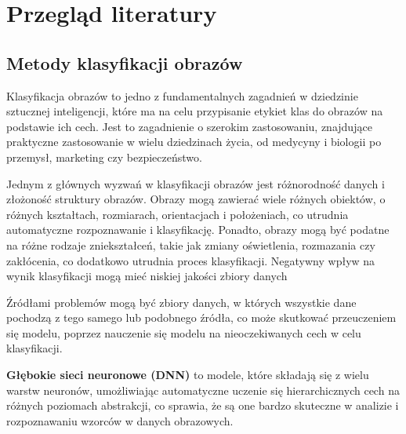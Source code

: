 
\chapter*{Przegląd literatury}
\section*{Metody klasyfikacji obrazów}

Klasyfikacja obrazów to jedno z fundamentalnych zagadnień w dziedzinie sztucznej inteligencji, które ma na celu przypisanie etykiet klas do obrazów na podstawie ich cech.
Jest to zagadnienie o szerokim zastosowaniu, znajdujące praktyczne zastosowanie w wielu dziedzinach życia, od medycyny\cite{medical} i biologii\cite{biology} po przemysł, marketing\cite{marketing} czy bezpieczeństwo\cite{security}.

Jednym z głównych wyzwań w klasyfikacji obrazów\cite{imageclassificationchallanges} jest różnorodność danych i złożoność struktury obrazów.
Obrazy mogą zawierać wiele różnych obiektów, o różnych kształtach, rozmiarach, orientacjach i położeniach, co utrudnia automatyczne rozpoznawanie i klasyfikację.
Ponadto, obrazy mogą być podatne na różne rodzaje zniekształceń, takie jak zmiany oświetlenia, rozmazania czy zakłócenia, co dodatkowo utrudnia proces klasyfikacji.
Negatywny wpływ na wynik klasyfikacji mogą mieć niskiej jakości zbiory danych

Źródłami  problemów mogą być zbiory danych, w których wszystkie dane pochodzą z tego samego lub podobnego źródła, co może skutkować przeuczeniem się modelu, poprzez nauczenie się modelu na nieoczekiwanych cech w celu klasyfikacji.

\textbf{Głębokie sieci neuronowe (DNN)}\cite{nature} to modele, które składają się z wielu warstw neuronów, umożliwiając automatyczne uczenie się hierarchicznych cech na różnych poziomach abstrakcji, co sprawia, że są one bardzo skuteczne w analizie i rozpoznawaniu wzorców w danych obrazowych.

